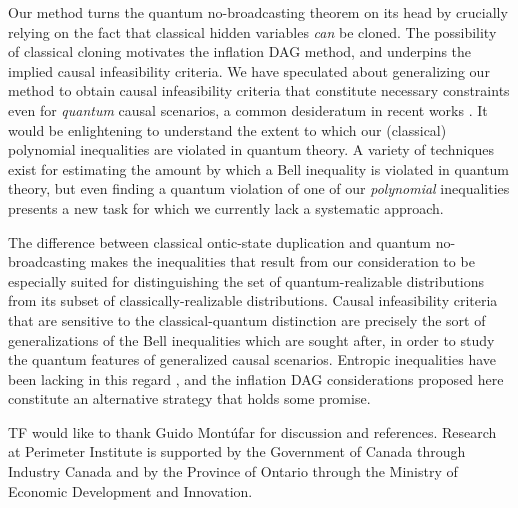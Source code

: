 Our method turns the quantum no-broadcasting theorem \cite{NoCloningQuantum1996,NoCloningGeneral2006} on its head by crucially relying on the fact that classical hidden variables \emph{can} be cloned. The possibility of classical cloning motivates the inflation DAG method, and underpins the implied causal infeasibility criteria. We have speculated about generalizing our method to obtain causal infeasibility criteria that constitute necessary constraints even for \emph{quantum} causal scenarios, a common desideratum in recent works \cite{fritz2012bell,pusey2014gdag,Chaves2015infoquantum,ChavesNoSignalling,BeyondBellII}. It would be enlightening to understand the extent to which our (classical) polynomial inequalities are violated in quantum theory. A variety of techniques exist for estimating the amount by which a Bell inequality \cite{NPA2008Long,I3322NPA1} is violated in quantum theory, but even finding a quantum violation of one of our \emph{polynomial} inequalities presents a new task for which we currently lack a systematic approach.

The difference between classical ontic-state duplication and quantum no-broadcasting makes the inequalities that result from our consideration to be especially suited for distinguishing the set of quantum-realizable distributions from its subset of classically-realizable distributions. Causal infeasibility criteria that are sensitive to the classical-quantum distinction are precisely the sort of generalizations of the Bell inequalities which are sought after, in order to study the quantum features of generalized causal scenarios. Entropic inequalities have been lacking in this regard \cite{fritz2012bell,pusey2014gdag,Chaves2015infoquantum}, and the inflation DAG considerations proposed here constitute an alternative strategy that holds some promise.





\begin{acknowledgments}
TF would like to thank Guido Mont\'ufar for discussion and references. Research at Perimeter Institute is supported by the Government of Canada through Industry Canada and by the Province of Ontario through the Ministry of Economic Development and Innovation.
\end{acknowledgments}


\onecolumngrid
\newpage
\appendix
\renewcommand{\theequation}{A-\arabic{equation}}
\setcounter{equation}{0}
\renewcommand\section{\clearpage\stdsection}










